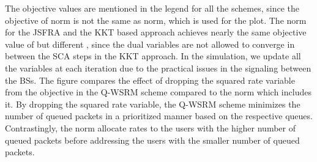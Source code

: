 The objective values are mentioned in the legend for all the schemes, since the objective of  norm is not the same as  norm, which is used for the plot. The  norm for the \ac{JSFRA} and the \ac{KKT} based approach achieves nearly the same objective value of  but different \me{\chi}, since the dual variables are not allowed to converge in between the \ac{SCA} steps in the \ac{KKT} approach. In the simulation, we update all the variables at each iteration due to the practical issues in the signaling between the \acp{BS}. The figure compares the effect of dropping the squared rate variable from the objective in the \ac{Q-WSRM} scheme compared to the  norm which includes it. By dropping the squared rate variable, the \ac{Q-WSRM} scheme minimizes the number of queued packets in a prioritized manner based on the respective queues. Contrastingly, the  norm allocate rates to the users with the higher number of queued packets before addressing the users with the smaller number of queued packets.


